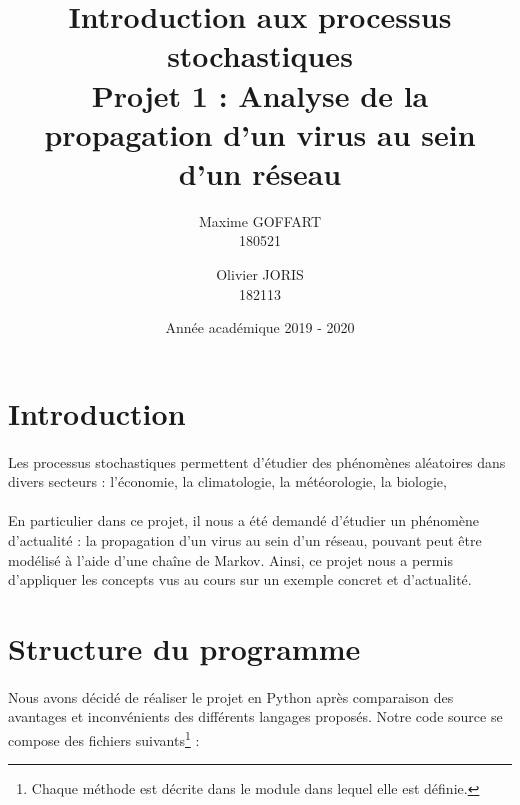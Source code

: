 \documentclass[a4paper, 12pt, oneside]{article}
\title{\textbf{Introduction aux processus stochastiques}\\
	   Projet 1 : Analyse de la propagation d'un virus au sein d'un réseau}
\author{Maxime GOFFART \\180521 \and Olivier JORIS\\182113}
\date{Année académique 2019 - 2020}
\begin{document}
\maketitle
\newpage

\tableofcontents
\newpage

\section{Introduction}

\paragraph{}Les processus stochastiques permettent d'étudier des phénomènes aléatoires dans divers secteurs : l'économie, la climatologie, la météorologie, la biologie, \dotso

\paragraph{}En particulier dans ce projet, il nous a été demandé d'étudier un phénomène d'actualité : la propagation d'un virus au sein d'un réseau, pouvant peut être modélisé à l'aide d'une chaîne de Markov. Ainsi, ce projet nous a permis d'appliquer les concepts vus au cours sur un exemple concret et d'actualité.

\section{Structure du programme} 
\paragraph{}Nous avons décidé de réaliser le projet en Python après comparaison des avantages et inconvénients des différents langages proposés. Notre code source se compose des fichiers suivants\footnote{Chaque méthode est décrite dans le module dans lequel elle est définie.} :
\end{document}
